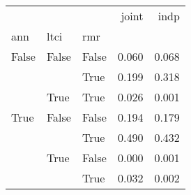 \begin{tabular}{lllrr}
\toprule
     &      &      &  joint &   indp \\
ann & ltci & rmr &        &        \\
\midrule
False & False & False &  0.060 &  0.068 \\
     &      & True &  0.199 &  0.318 \\
     & True & True &  0.026 &  0.001 \\
True & False & False &  0.194 &  0.179 \\
     &      & True &  0.490 &  0.432 \\
     & True & False &  0.000 &  0.001 \\
     &      & True &  0.032 &  0.002 \\
\bottomrule
\end{tabular}
